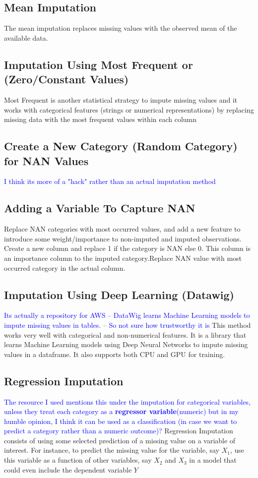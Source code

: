 \documentclass{article}
\begin{document}
\subsection{Mean Imputation}
The mean imputation replaces missing values with the observed mean of the available data.

\subsection{Imputation Using Most Frequent or (Zero/Constant Values)}
Most Frequent is another statistical strategy to impute missing values and it works with categorical features (strings or numerical representations) by replacing missing data with the most frequent values within each column

\subsection{Create a New Category (Random Category) for NAN Values}
\textcolor{blue}{I think its more of a "hack" rather than an actual imputation method}

\subsection{ Adding a Variable To Capture NAN}
Replace NAN categories with most occurred values, and add a new feature to introduce some weight/importance to non-imputed and imputed observations. Create a new column and replace 1 if the category is NAN else 0. This column is an importance column to the imputed category.Replace NAN value with most occurred category in the actual column.

\subsection{Imputation Using Deep Learning (Datawig)}
\textcolor{blue}{Its actually a repository for AWS -- DataWig learns Machine Learning models to impute missing values in tables. -- So not sure how trustworthy it is}
This method works very well with categorical and non-numerical features. It is a library that learns Machine Learning models using Deep Neural Networks to impute missing values in a dataframe. It also supports both CPU and GPU for training.

\subsection{Regression Imputation}
\textcolor{blue}{The resource I used mentions this under the imputation for categorical variables, unless they treat each category as a \textbf{regressor variable}(numeric) but in my humble opinion, I think it can be used as a classification (in case we want to predict a category rather than a numeric outcome)?}
Regression Imputation consists of using some selected prediction of a missing value  on a variable of interest. For instance, to predict the missing value for the variable, say $X_1$, use this variable as a function of other variables, say $X_2$ and $X_3$ in a model that could even include the dependent variable $Y$
\end{document}
